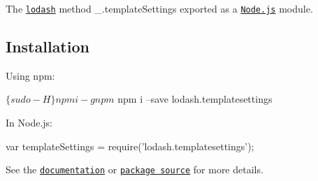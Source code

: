 The \href{https://lodash.com/}{\tt lodash} method {\ttfamily \+\_\+.\+template\+Settings} exported as a \href{https://nodejs.org/}{\tt Node.\+js} module.

\subsection*{Installation}

Using npm\+: 
\begin{DoxyCode}
$ \{sudo -H\} npm i -g npm
$ npm i --save lodash.templatesettings
\end{DoxyCode}


In Node.\+js\+: 
\begin{DoxyCode}
var templateSettings = require('lodash.templatesettings');
\end{DoxyCode}


See the \href{https://lodash.com/docs#templateSettings}{\tt documentation} or \href{https://github.com/lodash/lodash/blob/4.1.0-npm-packages/lodash.templatesettings}{\tt package source} for more details. 